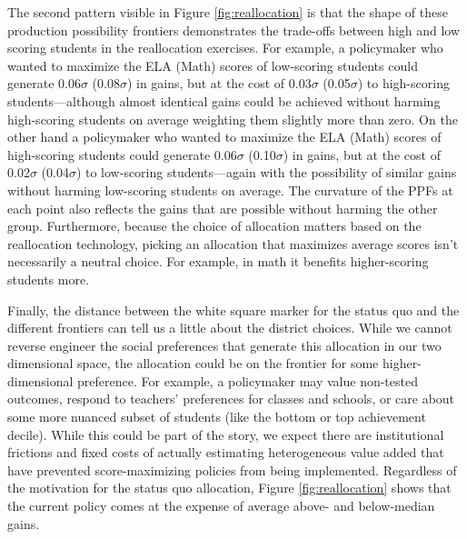 \documentclass[12pt]{article}
\theoremstyle{definition}
\theoremstyle{definition}
\theoremstyle{definition}
\theoremstyle{definition}
\begin{document}
The second pattern visible in Figure \ref{fig:reallocation} is that the shape of these production possibility frontiers demonstrates the trade-offs between high and low scoring students in the reallocation exercises. For example, a policymaker who wanted to maximize the ELA (Math) scores of low-scoring students could generate  0.06$\sigma$ (0.08$\sigma$) in gains, but at the cost of 0.03$\sigma$ (0.05$\sigma$) to high-scoring students---although almost identical gains could be achieved without harming high-scoring students on average weighting them slightly more than zero. On the other hand a policymaker who wanted to maximize the ELA (Math) scores of high-scoring students could generate  0.06$\sigma$ (0.10$\sigma$) in gains, but at the cost of 0.02$\sigma$ (0.04$\sigma$) to low-scoring students---again with the possibility of similar gains without harming low-scoring students on average. The curvature of the PPFs at each point also reflects the gains that are possible without harming the other group. Furthermore, because  the choice of allocation matters based on the reallocation technology, picking an allocation that maximizes average scores isn't necessarily a  neutral choice. For example, in math it benefits higher-scoring students more. 


Finally, the distance between the white square marker for the status quo and the different frontiers can tell us a little about the district choices. While we cannot reverse engineer the social preferences that generate this allocation in our two dimensional space, the allocation could be on the frontier for some higher-dimensional preference. For example, a policymaker may value non-tested outcomes, respond to teachers' preferences for classes and schools, or care about some more nuanced subset of students (like the bottom or top achievement decile). While this could be part of the story, we expect there are institutional frictions and fixed costs of actually estimating heterogeneous value added that have prevented score-maximizing policies from being implemented. Regardless of the motivation for the status quo allocation, Figure \ref{fig:reallocation} shows that the current policy comes at the expense of average above- and below-median gains.
 
\end{document}
